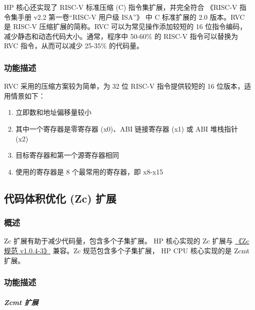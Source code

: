 \documentclass[main\_\_CN.tex]{subfiles}
\begin{document}
HP 核心还实现了 RISC-V 标准压缩 (C) 指令集扩展，并完全符合 《RISC-V 指令集手册 v2.2 第一卷“RISC-V 用户级 ISA”》 中 C 标准扩展的 2.0 版本。RVC 是 RISC-V 压缩扩展的简称。RVC 可以为常见操作添加较短的 16 位指令编码，减少静态和动态代码大小。通常，程序中 50-60\% 的 RISC-V 指令可以替换为 RVC 指令，从而可以减少 25-35\% 的代码量。

\subsubsection{功能描述}
\label{sec:riscvcpu-cext-func-descr}
RVC 采用的压缩方案较为简单，为 32 位 RISC-V 指令提供较短的 16 位版本，适用情景如下：
\begin{enumerate}
    \item 立即数和地址偏移量较小
    \item 其中一个寄存器是零寄存器 (x0)、ABI 链接寄存器 (x1) 或 ABI 堆栈指针 (x2)
    \item 目标寄存器和第一个源寄存器相同
    \item 使用的寄存器是 8 个最常用的寄存器，即 x8-x15
\end{enumerate}

\newpage


\newpage
\subsection{代码体积优化 (Zc) 扩展}
\label{sec:riscvcpu-zc}

\subsubsection{概述}
\label{sec:riscvcpu-zc-overview}

Zc 扩展有助于减少代码量，包含多个子集扩展。\chipname{} HP 核心实现的 Zc 扩展与 \href{https://github.com/riscvarchive/riscv-code-size-reduction/blob/v1.0.4-3/Zc-specification/Zc.adoc}{《Zc 规范 v1.0.4-3》} 兼容。Zc 规范包含多个子集扩展，\chipname{} HP CPU 核心实现的是 Zcmt 扩展。

\subsubsection{功能描述}
\label{sec:riscvcpu-zc-func-descr}






\subparagraph{Zcmt 扩展}
\end{document}
